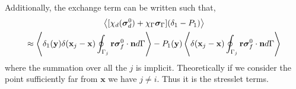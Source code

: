 {Additionally, the exchange term can be written such that,
\begin{multline*}
    \avg{[\chi_d (\bm\sigma_d^0) + \chi_\Gamma \bm\sigma_\Gamma ]  (\delta_1 - P_1)}\\
    \approx 
    \avg{\delta_1(\textbf{y}) \delta(\textbf{x}_j - \textbf{x})\intS[j]{\textbf{r}\bm\sigma_f^0\cdot \textbf{n}}}
    - P_1(\textbf{y}) \avg{\delta(\textbf{x}_j - \textbf{x})\intS[j]{\textbf{r}\bm\sigma_f^0\cdot \textbf{n}}}
\end{multline*}
where the summation over all the $j$ is implicit. 
Theoretically if we consider the point sufficiently far from $\textbf{x}$ we have $j\neq i$.
Thus it is the stresslet terms. 



}
